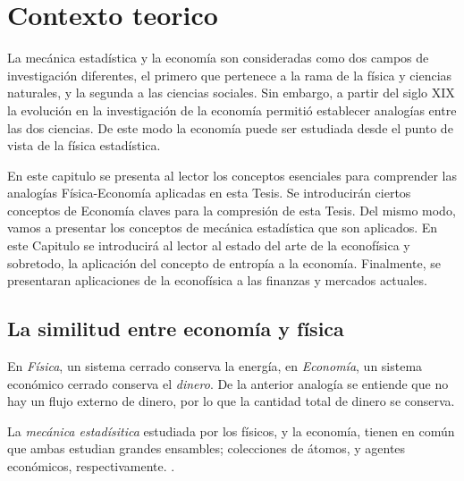 %
\chapter{Contexto teorico}
\label{contexto}



La mecánica estadística y la economía son consideradas como dos campos de investigación diferentes, el primero que pertenece a la rama de la física y ciencias naturales, y la segunda a las ciencias sociales.
Sin embargo, a partir del siglo XIX la evolución en la investigación de la economía permitió establecer analogías entre las dos ciencias.
De este modo la economía puede ser estudiada desde el punto de vista de la física estadística.

En este capitulo se presenta al lector los conceptos esenciales para comprender las analogías Física-Economía aplicadas en esta Tesis.
Se introducirán ciertos conceptos de Economía claves para la compresión de esta Tesis.
Del mismo modo, vamos a presentar los conceptos de mecánica estadística que son aplicados. 
En este Capitulo se introducirá al lector al estado del arte de la econofísica y sobretodo, la aplicación del concepto de entropía a la economía.
Finalmente, se presentaran aplicaciones de la econofísica a las finanzas y mercados actuales.

\section{La similitud entre economía y física}


En \textit{Física}, un sistema cerrado conserva la energía,  en \textit{Economía}, un sistema económico cerrado conserva el \textit{dinero}. 
De la anterior analogía se entiende que no hay un flujo externo de dinero, por lo que la cantidad total de dinero se conserva.

La \textit{mecánica estadísitica} estudiada por los físicos, y la economía, tienen en común que ambas estudian grandes ensambles; colecciones de átomos, y agentes económicos, respectivamente.
\citep[][pagina 149]{cottrell_classical_2009}.

